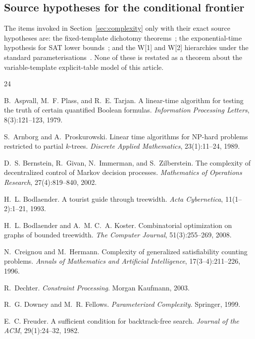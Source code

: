 \documentclass[11pt]{article}
\theoremstyle{plain}
\theoremstyle{definition}
\theoremstyle{remark}
\begin{document}
\subsection{Source hypotheses for the conditional frontier}

The items invoked in Section~\ref{sec:complexity} only with their exact
source hypotheses are: the fixed-template dichotomy
theorems~\cite{schaefer78,zhuk17}; the exponential-time hypothesis for SAT
lower bounds~\cite{impagliazzo-paturi01}; and the W[1] and W[2] hierarchies
under the standard parameterisations~\cite{downey-fellows99}.  None of these
is restated as a theorem about the variable-template explicit-table model of
this article.

\begin{thebibliography}{24}

 B.~Aspvall, M.~F. Plass, and R.~E. Tarjan.
A linear-time algorithm for testing the truth of certain quantified Boolean
formulas. \emph{Information Processing Letters}, 8(3):121--123, 1979.

 S.~Arnborg and A.~Proskurowski.
Linear time algorithms for NP-hard problems restricted to partial $k$-trees.
\emph{Discrete Applied Mathematics}, 23(1):11--24, 1989.

 D.~S. Bernstein, R.~Givan, N.~Immerman, and
S.~Zilberstein. The complexity of decentralized control of Markov decision
processes. \emph{Mathematics of Operations Research}, 27(4):819--840, 2002.

 H.~L. Bodlaender.
A tourist guide through treewidth. \emph{Acta Cybernetica},
11(1--2):1--21, 1993.

 H.~L. Bodlaender and A.~M. C.~A. Koster.
Combinatorial optimization on graphs of bounded treewidth.
\emph{The Computer Journal}, 51(3):255--269, 2008.

 N.~Creignou and M.~Hermann.
Complexity of generalized satisfiability counting problems.
\emph{Annals of Mathematics and Artificial Intelligence}, 17(3--4):211--226,
1996.

 R.~Dechter. \emph{Constraint Processing}.
Morgan Kaufmann, 2003.

 R.~G. Downey and M.~R. Fellows.
\emph{Parameterized Complexity}. Springer, 1999.

 E.~C. Freuder. A sufficient condition for backtrack-free
search. \emph{Journal of the ACM}, 29(1):24--32, 1982.


\end{thebibliography}
\end{document}
